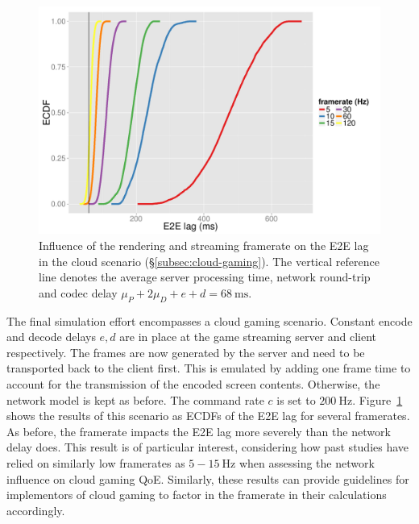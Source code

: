 \begin{figure}[!t]
	\centering
	\includegraphics[width=1.0\columnwidth]{../../../simulation/visualization/cloudgaming-lag-cdf.pdf}
	\caption{Influence of the rendering and streaming framerate on the \gls{E2E} lag in the cloud scenario (§\ref{subsec:cloud-gaming}). The vertical reference line denotes the average server processing time, network round-trip and codec delay $\mu_P+2\mu_D+e+d=\SI{68}{\milli\second}$.}
\label{fig:cloud-e2e-delay-sim}
\end{figure}

The final simulation effort encompasses a cloud gaming scenario. Constant encode  and decode delays $e,d$ are in place at the game streaming server and client respectively. The frames are now generated by the server and need to be transported back to the client first. This is emulated by adding one frame time to account for the transmission of the encoded screen contents. Otherwise, the network model is kept as before. The command rate $c$ is set to $\SI{200}{\hertz}$. Figure~\ref{fig:cloud-e2e-delay-sim} shows the results of this scenario as \acrshort{ECDF}s of the \gls{E2E} lag for several framerates. As before, the framerate impacts the \gls{E2E} lag more severely than the network delay does. This result is of particular interest, considering how past studies have relied on similarly low framerates as $5-\SI{15}{\hertz}$ when assessing the network influence on cloud gaming \gls{QoE}. Similarly, these results can provide guidelines for implementors of cloud gaming to factor in the framerate in their calculations accordingly.


